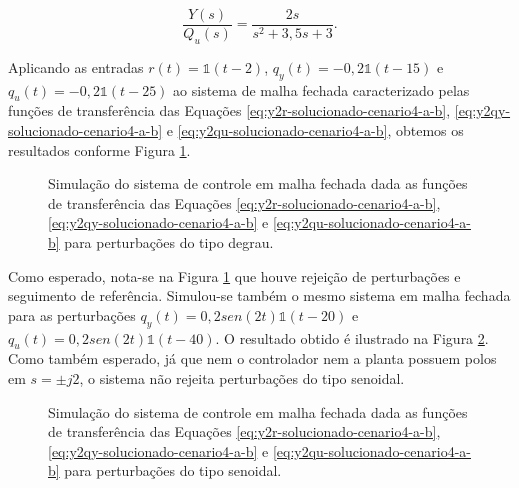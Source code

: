 \begin{equation}
    \label{eq:y2qu-solucionado-cenario4-a-b}
    \frac{Y(s)}{Q_{u}(s)} = \frac{2s}{s^2 + 3,5s + 3}.
\end{equation}

Aplicando as entradas $r(t) = \mathds{1}(t - 2)$, $q_{y}(t) = -0,2\mathds{1}(t -
15)$ e $q_{u}(t) = -0,2\mathds{1}(t - 25)$ ao sistema de malha fechada
caracterizado pelas funções de transferência das Equações
\ref{eq:y2r-solucionado-cenario4-a-b}, \ref{eq:y2qy-solucionado-cenario4-a-b} e
\ref{eq:y2qu-solucionado-cenario4-a-b}, obtemos os resultados conforme Figura
\ref{fig:resultado-cenario4-a}.

\begin{figure}[!ht]
    \caption{Simulação do sistema de controle em malha fechada dada as funções
    de transferência das Equações
    \ref{eq:y2r-solucionado-cenario4-a-b}, \ref{eq:y2qy-solucionado-cenario4-a-b} e
    \ref{eq:y2qu-solucionado-cenario4-a-b} para perturbações do tipo degrau.}
    \vspace{-10pt}
    \hspace{-30pt}
    \label{fig:resultado-cenario4-a}
    \begin{minipage}{\linewidth}
        
    \end{minipage}
\end{figure}

Como esperado, nota-se na Figura \ref{fig:resultado-cenario4-a} que
houve rejeição de perturbações e seguimento de referência. Simulou-se também o
mesmo sistema em malha fechada para as perturbações $q_{y}(t) =
0,2sen(2t)\mathds{1}(t - 20)$ e $q_{u}(t) = 0,2sen(2t)\mathds{1}(t - 40)$. O
resultado obtido é ilustrado na Figura \ref{fig:resultado-cenario4-b}.
Como também esperado, já que nem o controlador nem a planta possuem polos em $s
= \pm j2$, o sistema não rejeita perturbações do tipo senoidal.

\begin{figure}[!ht]
    \caption{Simulação do sistema de controle em malha fechada dada as funções
    de transferência das Equações
    \ref{eq:y2r-solucionado-cenario4-a-b}, \ref{eq:y2qy-solucionado-cenario4-a-b} e
    \ref{eq:y2qu-solucionado-cenario4-a-b} para perturbações do tipo senoidal.}
    \vspace{-10pt}
    \hspace{-30pt}
    \label{fig:resultado-cenario4-b}
    \begin{minipage}{\linewidth}
        
    \end{minipage}
\end{figure}

